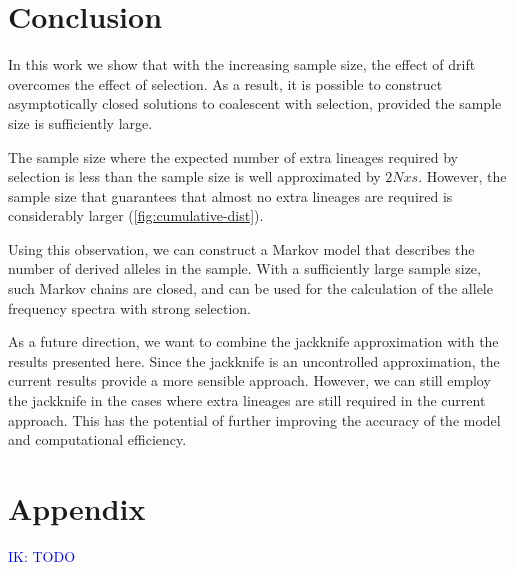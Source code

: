 \documentclass[review]{elsarticle}
\newcommand{\ikcomment}[1]{\textcolor{blue}{IK: #1}}
\begin{document}
\section{Conclusion}
\label{sec:conclusion}

In this work we show that with the increasing sample size, the effect of drift overcomes the effect
of selection. As a result, it is possible to construct asymptotically closed solutions to coalescent
with selection, provided the sample size is sufficiently large.

The sample size where the expected number of extra lineages required by selection is less than the
sample size is well approximated by $2Nxs$. However, the sample size that guarantees that almost no
extra lineages are required is considerably larger (\ref{fig:cumulative-dist}).

Using this observation, we can construct a Markov model that describes the number of derived alleles
in the sample. With a sufficiently large sample size, such Markov chains are closed, and can be used
for the calculation of the allele frequency spectra with strong selection.

As a future direction, we want to combine the jackknife approximation \citep{JouganousEtAl2017} with the
results presented here. Since the jackknife is an uncontrolled approximation, the current results
provide a more sensible approach. However, we can still employ the jackknife in the cases where
extra lineages are still required in the current approach. This has the potential of further
improving the accuracy of the model and computational efficiency.

\section{Appendix}

\ikcomment{TODO}



\end{document}
